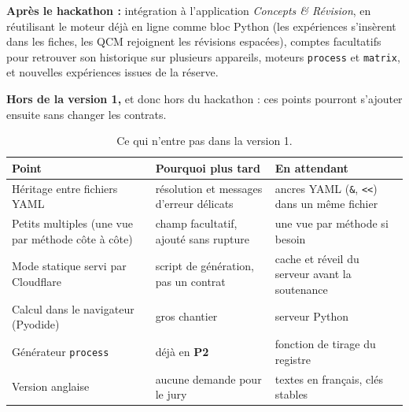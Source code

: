 \documentclass[11pt,a4paper]{article}
\newcommand{\ptwo}{\colorbox{ctBaseline!18}{\footnotesize\textbf{P2}}}
\begin{document}
\textbf{Après le hackathon :} intégration à l'application \emph{Concepts \& Révision}, en réutilisant le moteur déjà en ligne comme bloc Python (les expériences s'insèrent dans les fiches, les QCM rejoignent les révisions espacées), comptes facultatifs pour retrouver son historique sur plusieurs appareils, moteurs \texttt{process} et \texttt{matrix}, et nouvelles expériences issues de la réserve.

\textbf{Hors de la version 1,} et donc hors du hackathon : ces points pourront s'ajouter ensuite sans changer les contrats.
\begin{table}[H]
  \centering
  \small
  \begin{tabularx}{\textwidth}{@{}L{5cm} Y Y@{}}
    \toprule
    \textbf{Point} & \textbf{Pourquoi plus tard} & \textbf{En attendant} \\
    \midrule
    Héritage entre fichiers YAML & résolution et messages d'erreur délicats & ancres YAML (\texttt{\&}, \texttt{<<}) dans un même fichier \\
    Petits multiples (une vue par méthode côte à côte) & champ facultatif, ajouté sans rupture & une vue par méthode si besoin \\
    Mode statique servi par Cloudflare & script de génération, pas un contrat & cache et réveil du serveur avant la soutenance \\
    Calcul dans le navigateur (Pyodide) & gros chantier & serveur Python \\
    Générateur \texttt{process} & déjà en \ptwo{} & fonction de tirage  du registre \\
    Version anglaise & aucune demande pour le jury & textes en français, clés stables \\
    \bottomrule
  \end{tabularx}
  \caption{Ce qui n'entre pas dans la version 1.}
\end{table}
\end{document}
